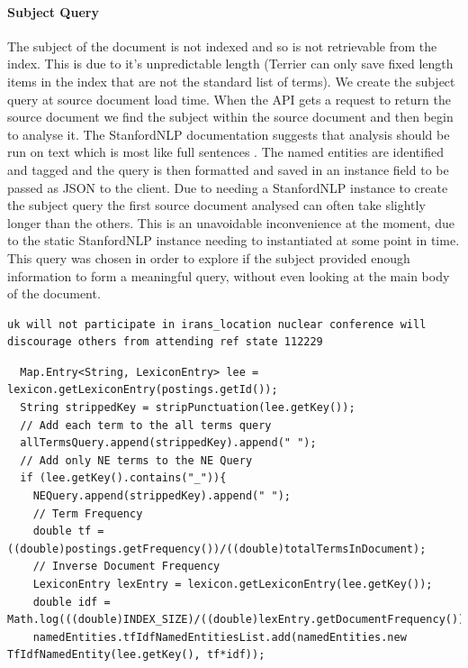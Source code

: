 \documentclass{l4proj}
\newenvironment{codelisting}{\captionsetup{type=listing}}{}
\begin{document}
\paragraph{Subject Query}
The subject of the document is not indexed and so is not retrievable from the index. This is due to it's unpredictable length (Terrier can only save fixed length items in the index that are not the standard list of terms).
We create the subject query at source document load time. When the API gets a request to return the source document we find the subject within the source document and then begin to analyse it. The StanfordNLP documentation suggests that analysis should be run on text which is most like full sentences \cite{caselessmodels}. The named entities are identified and tagged and the query is then formatted and saved in an instance field to be passed as JSON to the client.
Due to needing a StanfordNLP instance to create the subject query the first source document analysed can often take slightly longer than the others. This is an unavoidable inconvenience at the moment, due to the static StanfordNLP instance needing to instantiated at some point in time.
This query was chosen in order to explore if the subject provided enough information to form a meaningful query, without even looking at the main body of the document.\\
\begin{codelisting}
\begin{verbatim}
uk will not participate in irans_location nuclear conference will discourage others from attending ref state 112229
\end{verbatim}
\label{code:subject_query}
\end{codelisting}
\begin{codelisting}
\begin{verbatim}
  Map.Entry<String, LexiconEntry> lee = lexicon.getLexiconEntry(postings.getId());
  String strippedKey = stripPunctuation(lee.getKey());
  // Add each term to the all terms query
  allTermsQuery.append(strippedKey).append(" ");
  // Add only NE terms to the NE Query 
  if (lee.getKey().contains("_")){
    NEQuery.append(strippedKey).append(" ");
    // Term Frequency
    double tf = ((double)postings.getFrequency())/((double)totalTermsInDocument);
    // Inverse Document Frequency
    LexiconEntry lexEntry = lexicon.getLexiconEntry(lee.getKey());
    double idf = Math.log(((double)INDEX_SIZE)/((double)lexEntry.getDocumentFrequency()));
    namedEntities.tfIdfNamedEntitiesList.add(namedEntities.new TfIdfNamedEntity(lee.getKey(), tf*idf));
\end{verbatim}
\label{code:query_generation}
\end{codelisting}
\end{document}
